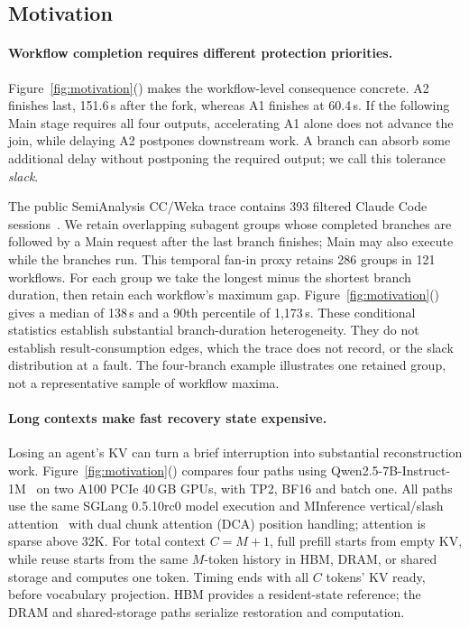 \subsection{Motivation}

\paragraph{Workflow completion requires different protection priorities.}
\label{sec:motivation-workflow}
Figure~\ref{fig:motivation}() makes the
workflow-level consequence concrete. A2 finishes last, 151.6\,s
after the fork, whereas A1 finishes at 60.4\,s. If the following Main stage
requires all four outputs, accelerating A1 alone does not advance the
join, while delaying A2 postpones downstream work. A branch can absorb
some additional delay without postponing the required output; we call
this tolerance \emph{slack}.

The public SemiAnalysis CC/Weka trace contains 393 filtered Claude Code
sessions~\cite{semianalysis2026cctraces}. We retain overlapping subagent
groups whose completed branches are followed by a Main request after the
last branch finishes; Main may also execute while the branches run.
This temporal fan-in proxy retains 286 groups in 121 workflows.
For each group we take the longest minus the shortest branch duration,
then retain each workflow's maximum gap.
Figure~\ref{fig:motivation}() gives a
median of 138\,s and a 90th percentile of 1,173\,s. These conditional
statistics establish substantial branch-duration heterogeneity. They do
not establish result-consumption edges, which the trace does not record,
or the slack distribution at a fault. The four-branch example illustrates
one retained group, not a representative sample of workflow maxima.

\paragraph{Long contexts make fast recovery state expensive.}
\label{sec:motivation-long-context}
Losing an agent's KV can turn a brief interruption into substantial
reconstruction work. Figure~\ref{fig:motivation}()
compares four paths using Qwen2.5-7B-Instruct-1M~\cite{qwen2025qwen25oneM}
on two A100 PCIe 40\,GB GPUs, with TP2, BF16 and batch one.
All paths use the same SGLang 0.5.10rc0 model execution and
MInference vertical/slash attention~\cite{jiang2024minference} with dual chunk
attention (DCA) position handling; attention is sparse above 32K.
For total context $C=M+1$, full prefill starts from empty KV, while reuse
starts from the same $M$-token history in HBM, DRAM, or shared storage and
computes one token. Timing ends with all $C$ tokens' KV ready, before
vocabulary projection. HBM provides a resident-state reference; the
DRAM and shared-storage paths serialize restoration and computation.

